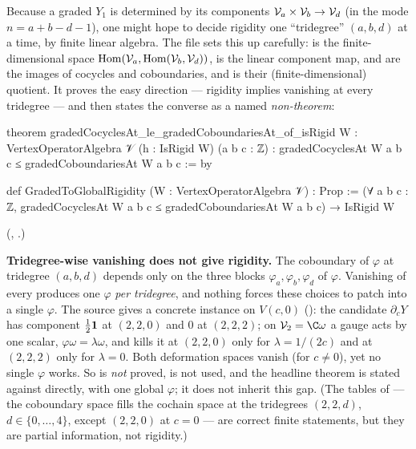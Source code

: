 Because a graded $Y_1$ is determined by its components $\mathcal{V}_a\times\mathcal{V}_b\to\mathcal{V}_d$ (in the mode
$n = a+b-d-1$), one might hope to decide rigidity one ``tridegree'' $(a,b,d)$ at a time, by finite
linear algebra. The file  sets this up carefully:
 is the finite-dimensional space
$\mathrm{Hom}(\mathcal{V}_a,\mathrm{Hom}(\mathcal{V}_b,\mathcal{V}_d))$,  is the linear component map,
 and  are the images of cocycles and coboundaries,
and  is their (finite-dimensional) quotient. It proves the easy
direction --- rigidity implies vanishing at every tridegree --- and then states the converse as a
named \emph{non-theorem}:
\begin{leancode}
theorem gradedCocyclesAt_le_gradedCoboundariesAt_of_isRigid {W : VertexOperatorAlgebra 𝒱}
    (h : IsRigid W) (a b c : ℤ) :
    gradedCocyclesAt W a b c ≤ gradedCoboundariesAt W a b c := by

def GradedToGlobalRigidity (W : VertexOperatorAlgebra 𝒱) : Prop :=
  (∀ a b c : ℤ, gradedCocyclesAt W a b c ≤ gradedCoboundariesAt W a b c) → IsRigid W
\end{leancode}
(, .)

\begin{warning}\label{l07:warn:tridegree}
\textbf{Tridegree-wise vanishing does not give rigidity.} The coboundary of $\varphi$ at tridegree
$(a,b,d)$ depends only on the three blocks $\varphi_a,\varphi_b,\varphi_d$ of $\varphi$. Vanishing of
every  produces one $\varphi$ \emph{per tridegree}, and nothing forces these
choices to patch into a single $\varphi$. The source gives a concrete instance on $V(c,0)$
(): the candidate $\partial_cY$ has component
$\frac12\mathbf{1}$ at $(2,2,0)$ and $0$ at $(2,2,2)$; on $\lsevenV_2 = \C\omega$ a gauge acts by one scalar,
$\varphi\omega = \lambda\omega$, and kills it at $(2,2,0)$ only for $\lambda = 1/(2c)$ and at $(2,2,2)$ only
for $\lambda = 0$. Both deformation spaces vanish (for $c\ne0$), yet no single $\varphi$ works. So
 is \emph{not} proved, is not used, and the headline theorem is stated
against  directly, with one global $\varphi$; it does not inherit this gap. (The
tables of  --- the coboundary space fills the cochain space at the
tridegrees $(2,2,d)$, $d\in\{0,\dots,4\}$, except $(2,2,0)$ at $c = 0$ --- are correct finite
statements, but they are partial information, not rigidity.)
\end{warning}

